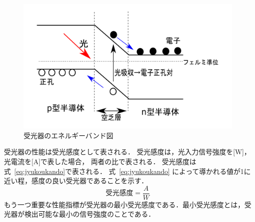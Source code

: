 \begin{figure}[t!]
\begin{center}
\includegraphics[keepaspectratio,scale=0.5]{fig/3/photodiode.pdf}
\caption{受光器のエネルギーバンド図}
\label{fig:photo}
\end{center}
\end{figure}
受光器の性能は受光感度として表される．
受光感度は，光入力信号強度を[W]，光電流を[A]で表した場合，
両者の比で表される．
受光感度は式~\eqref{eq:jyukoukando}で表される．
式~\eqref{eq:jyukoukando} によって導かれる値が1に近い程，感度の良い受光器であることを示す．
\begin{equation}
受光感度 = \frac{A}{W}
\label{eq:jyukoukando}
\end{equation}
もう一つ重要な性能指標が受光器の最小受光感度である．最小受光感度とは，受光器が検出可能な最小の信号強度のことである．

